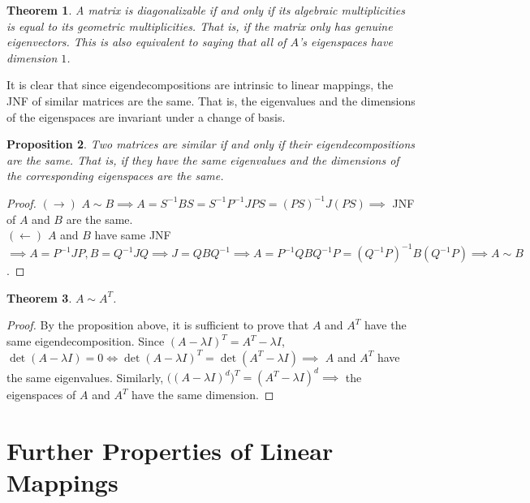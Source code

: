 \documentclass{article}
\newtheorem{theorem}{Theorem}[section]
\newtheorem{proposition}[theorem]{Proposition}
\theoremstyle{remark}
\theoremstyle{definition}
\begin{document}
\begin{theorem}
A matrix is diagonalizable if and only if its algebraic multiplicities is equal to its geometric multiplicities. That is, if the matrix only has genuine eigenvectors. This is also equivalent to saying that all of $A$'s eigenspaces have dimension $1$. 
\end{theorem}

It is clear that since eigendecompositions are intrinsic to linear mappings, the JNF of similar matrices are the same. That is, the eigenvalues and the dimensions of the eigenspaces are invariant under a change of basis. 

\begin{proposition}
Two matrices are similar if and only if their eigendecompositions are the same. That is, if they have the same eigenvalues and the dimensions of the corresponding eigenspaces are the same. 
\end{proposition}

\begin{proof}
$(\rightarrow)$ $A \sim B \implies A = S^{-1} B S = S^{-1} P^{-1} J P S = (PS)^{-1} J (PS) \implies$ JNF of $A$ and $B$ are the same.  \\
$(\leftarrow)$ $A$ and $B$ have same JNF $\implies A = P^{-1} J P, B = Q^{-1} J Q \implies J = Q B Q^{-1} \implies A = P^{-1} Q B Q^{-1} P = (Q^{-1} P)^{-1} B (Q^{-1} P) \implies A \sim B$. 
\end{proof}

\begin{theorem}
$A \sim A^T$. 
\end{theorem}
\begin{proof}
By the proposition above, it is sufficient to prove that $A$ and $A^T$ have the same eigendecomposition. Since $(A - \lambda I)^T = A^T - \lambda I$, $\det{(A - \lambda I)} = 0 \iff \det{(A - \lambda I)^T} = \det{(A^T - \lambda I)} \implies $ $A$ and $A^T$ have the same eigenvalues. Similarly, $\big( (A - \lambda I)^d \big)^T = (A^T - \lambda I)^d \implies$ the eigenspaces of $A$ and $A^T$ have the same dimension. 
\end{proof}

\section{Further Properties of Linear Mappings}
\end{document}
